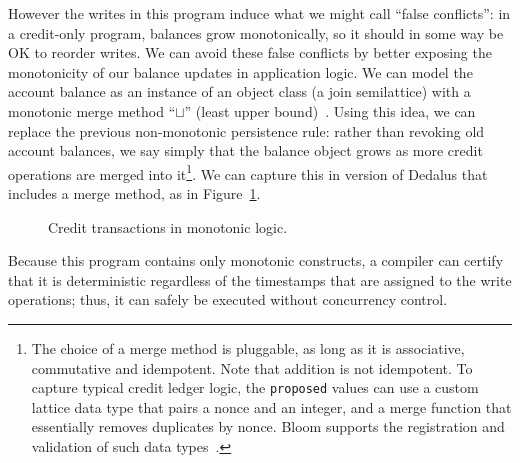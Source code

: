 \documentclass{sig-alternate}
\begin{document}
However the writes in this program induce what we might call ``false conflicts'': in a credit-only program, balances grow monotonically, so it should in some way be OK to reorder writes.  We can avoid these false conflicts by better exposing the monotonicity of our balance updates in application logic. We
can model the account balance as an instance of an object class (a join semilattice) with a monotonic merge method ``$\sqcup$'' (least upper bound)~\cite{Conway2012}. Using this idea, we can replace the previous non-monotonic persistence rule: rather than revoking old account balances,
we say simply that the balance object grows as more credit operations are merged into it\footnote{The choice of a merge method is pluggable, as long as it is associative, commutative and idempotent. Note that addition is not idempotent.  To capture typical credit ledger logic, the \texttt{proposed} values can use a custom lattice data type that pairs a nonce and an integer, and a merge function that essentially removes duplicates by nonce.  Bloom supports the registration and validation of such data types~\cite{Conway2012}.}.  We can capture this in version of Dedalus that includes a merge method, as in Figure~\ref{fig:lattice_balance}.

\begin{figure}[h]
\begin{scriptsize}

\centering
\vspace{-10pt}
\caption{Credit transactions in monotonic logic.}
\label{fig:lattice_balance}
\end{scriptsize}
\vspace{-2pt}
\end{figure}

\noindent
Because this program contains only monotonic constructs, a compiler can 
certify that it is deterministic regardless of the timestamps that are
assigned to the write operations; thus, it can safely be executed without
concurrency control. 
\end{document}
